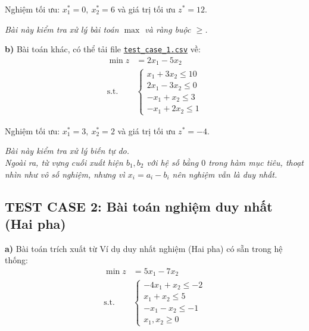 \documentclass[12pt,a4paper]{article}
\begin{document}
Nghiệm tối ưu: $x_1^* = 0,\ x_2^* = 6$ và giá trị tối ưu $z^* = 12$.

\textit{Bài này kiểm tra xử lý bài toán $\max$ và ràng buộc $\geq$.}

\noindent \textbf{b)} Bài toán khác, có thể tải file \href{https://drive.google.com/uc?export=download&id=1i2pmndpwRcxOxdcEim4_M5tUnrq7TVHh}{\texttt{test\_case\_1.csv}} về:
\begin{equation*}
    \begin{aligned}
        \min z &= 2x_1 - 5x_2 \\
        \text{s.t.} \quad 
        &\begin{cases}
            x_1 + 3x_2 \leq 10 \\
            2x_1 - 3x_2 \leq 0 \\
            -x_1 + x_2 \leq 3 \\
            -x_1 + 2x_2 \leq 1
        \end{cases}
    \end{aligned}
\end{equation*}

Nghiệm tối ưu: $x_1^* = 3,\ x_2^* = 2$ và giá trị tối ưu $z^* = -4$.

\textit{Bài này kiểm tra xử lý biến tự do.\\Ngoài ra, từ vựng cuối xuất hiện $b_1, b_2$ với hệ số bằng $0$ trong hàm mục tiêu, thoạt nhìn như vô số nghiệm, nhưng vì $x_i = a_i - b_i$ nên nghiệm vẫn là duy nhất.}


\subsection*{TEST CASE 2: Bài toán nghiệm duy nhất (Hai pha)}

\noindent \textbf{a)} Bài toán trích xuất từ \colorbox{green!30}{Ví dụ duy nhất nghiệm (Hai pha)} có sẵn trong hệ thống:
\begin{equation*}
    \begin{aligned}
        \min z &= 5x_1 - 7x_2 \\
        \text{s.t.} \quad
        &\begin{cases}
            -4x_1 + x_2  \leq -2 \\
             x_1  + x_2  \leq  5 \\
            -x_1  - x_2  \leq -1 \\
            x_1, x_2 \geq 0
        \end{cases}
    \end{aligned}
\end{equation*}
\end{document}

